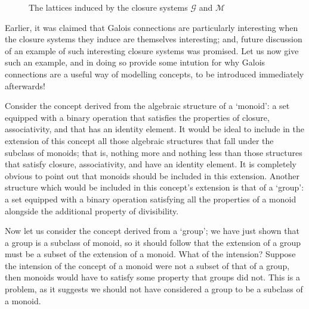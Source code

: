 \begin{figure}[H]
  \vspace{-6em}
  \caption{The lattices induced by the closure systems $\mathcal{G}$ and $\mathcal{M}$}
  \label{figure:two-lattices}
\end{figure}

Earlier, it was claimed that Galois connections are particularly interesting when the closure systems they induce are themselves interesting; and, future discussion of an example of such interesting closure
systems was promised. Let us now give such an example, and in doing so provide some intution for why Galois connections are a useful way of modelling concepts, to be introduced immediately afterwards!

Consider the concept derived from the algebraic structure of a `monoid': a set equipped with a binary operation that satisfies the properties of closure, associativity, and that has an identity element.
It would be ideal to include in the extension of this concept all those algebraic structures that fall under the subclass of monoids; that is, nothing more and nothing less than those structures that
satisfy closure, associativity, and have an identity element. It is completely obvious to point out that monoids should be included in this extension. Another structure which would be included in this
concept's extension is that of a `group': a set equipped with a binary operation satisfying all the properties of a monoid alongside the additional property of divisibility.

Now let us consider the concept derived from a `group'; we have just shown that a group is a subclass of monoid, so it should follow that the extension of a group must be a subset of the extension of a
monoid. What of the intension? Suppose the intension of the concept of a monoid were not a subset of that of a group, then monoids would have to satisfy some property that groups did not. This is a problem,
as it suggests we should not have considered a group to be a subclass of a monoid.

